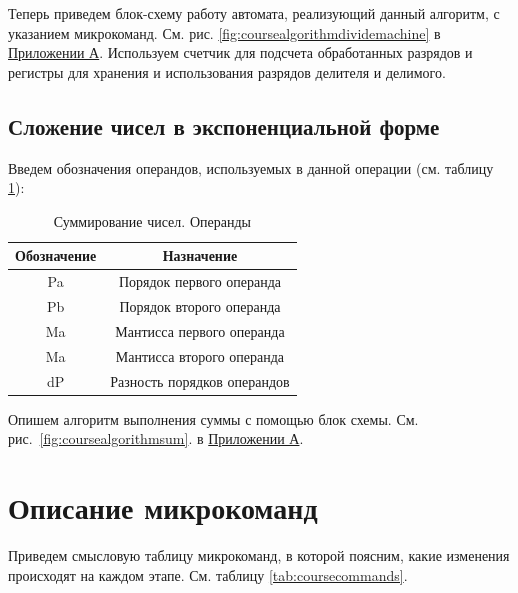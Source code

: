 \documentclass[a4paper,14pt]{extarticle}
\begin{document}
Теперь приведем блок-схему работу автомата, реализующий данный алгоритм, с указанием микрокоманд. См. рис. \ref{fig:coursealgorithmdividemachine} в \hyperref[tam]{Приложении А}. Используем счетчик для подсчета обработанных разрядов и регистры для хранения и использования разрядов делителя и делимого.
\fi

\subsection{Сложение чисел в экспоненциальной форме}
Введем обозначения операндов, используемых в данной операции (см. таблицу \ref{tab:varssum}):
\begin{table}[h!]
	\small
	\centering
	\begin{tabular}{|c|c|}
		\hline
		\multicolumn{1}{|c|}{\textbf{Обозначение}} & \multicolumn{1}{c|}{\textbf{Назначение}} \\ \hline
		Pa & Порядок первого операнда \\ \hline
		Pb & Порядок второго операнда \\ \hline
		Ma & Мантисса первого операнда \\ \hline
		Ma & Мантисса второго операнда \\ \hline
		dP & Разность порядков операндов \\ \hline
	\end{tabular}
	\caption{Суммирование чисел. Операнды}
	\label{tab:varssum}
	
\end{table} 

Опишем алгоритм выполнения суммы  с помощью блок схемы. См. рис.~\ref{fig:coursealgorithmsum}. в \hyperref[tam]{Приложении А}.


\section{Описание микрокоманд}

Приведем смысловую таблицу микрокоманд, в которой поясним, какие изменения происходят на каждом этапе. См. таблицу \ref{tab:coursecommands}.
\end{document}

